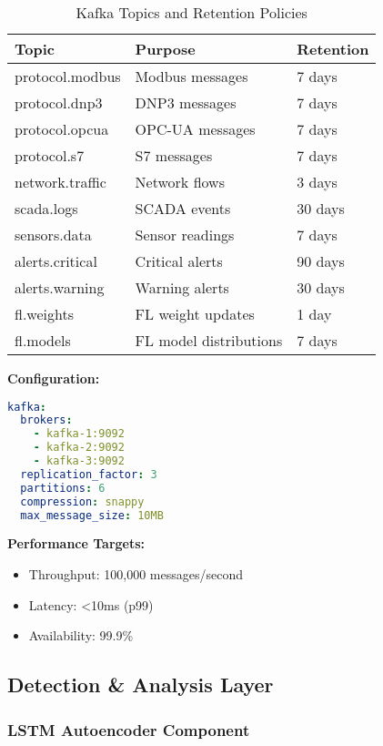 \documentclass[12pt,a4paper]{article}
\begin{document}
\begin{table}[H]
\centering
\small
\begin{tabular}{|l|l|l|}
\hline
\textbf{Topic} & \textbf{Purpose} & \textbf{Retention} \\
\hline
protocol.modbus & Modbus messages & 7 days \\
protocol.dnp3 & DNP3 messages & 7 days \\
protocol.opcua & OPC-UA messages & 7 days \\
protocol.s7 & S7 messages & 7 days \\
network.traffic & Network flows & 3 days \\
scada.logs & SCADA events & 30 days \\
sensors.data & Sensor readings & 7 days \\
alerts.critical & Critical alerts & 90 days \\
alerts.warning & Warning alerts & 30 days \\
fl.weights & FL weight updates & 1 day \\
fl.models & FL model distributions & 7 days \\
\hline
\end{tabular}
\caption{Kafka Topics and Retention Policies}
\end{table}

\textbf{Configuration:}
\begin{lstlisting}[language=yaml]
kafka:
  brokers:
    - kafka-1:9092
    - kafka-2:9092
    - kafka-3:9092
  replication_factor: 3
  partitions: 6
  compression: snappy
  max_message_size: 10MB
\end{lstlisting}

\textbf{Performance Targets:}
\begin{itemize}[leftmargin=1cm,itemsep=0pt]
    \item Throughput: 100,000 messages/second
    \item Latency: <10ms (p99)
    \item Availability: 99.9\%
\end{itemize}

\subsection{Detection \& Analysis Layer}

\subsubsection{LSTM Autoencoder Component}
\end{document}
